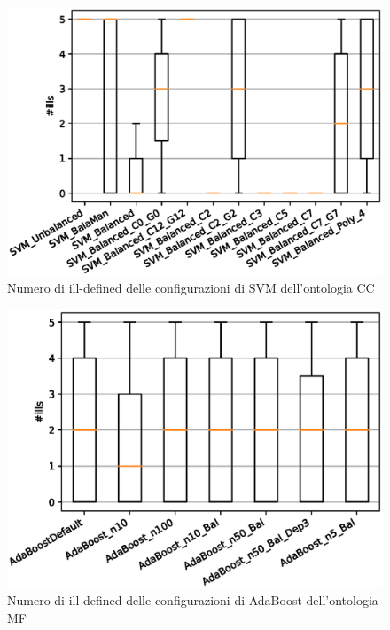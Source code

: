 \documentclass[12pt,a4paper,oneside,hidelinks]{report}
\begin{document}
\begin{figure}[hb]%
    \centering
    \includegraphics[scale = 0.80]{CC-SVM-ills.eps}%
    \caption{Numero di ill-defined delle configurazioni di SVM dell'ontologia CC}%
    \label{figure:ill12}%
\end{figure}

\vspace*{\fill}

\vspace*{\fill}

\begin{figure}[ht]%
    \centering
    \includegraphics[scale = 0.80]{MF-AdaBoost-ills.eps}%
    \caption{Numero di ill-defined delle configurazioni di AdaBoost dell'ontologia MF}%
    \label{fig:ill13}%
\end{figure}
\end{document}
